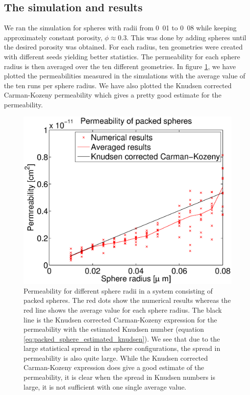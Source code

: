 \subsection{The simulation and results}
We ran the simulation for spheres with radii from \unit{0.01}{\micro\meter} to \unit{0.08}{\micro\meter} while keeping approximately constant porosity, $\phi\approx 0.3$. This was done by adding spheres until the desired porosity was obtained. For each radius, ten geometries were created with different seeds yielding better statistics. The permeability for each sphere radius is then averaged over the ten different geometries. In figure \ref{fig:packed_spheres_permeability}, we have plotted the permeabilities measured in the simulations with the average value of the ten runs per sphere radius. We have also plotted the Knudsen corrected Carman-Kozeny permeability which gives a pretty good estimate for the permeability. 
\begin{figure}[h]
\begin{center}
\includegraphics[width=\textwidth, trim=0cm 0cm 0cm 0cm, clip]{DSMC/figures/permeability_packed_spheres.eps}
\end{center}
\caption{Permeability for different sphere radii in a system consisting of packed spheres. The red dots show the numerical results whereas the red line shows the average value for each sphere radius. The black line is the Knudsen corrected Carman-Kozeny expression for the permeability with the estimated Knudsen number (equation \eqref{eq:packed_sphere_estimated_knudsen}). We see that due to the large statistical spread in the sphere configurations, the spread in permeability is also quite large. While the Knudsen corrected Carman-Kozeny expression does give a good estimate of the permeability, it is clear when the spread in Knudsen numbers is large, it is not sufficient with one single average value.}
\label{fig:packed_spheres_permeability}
\end{figure}